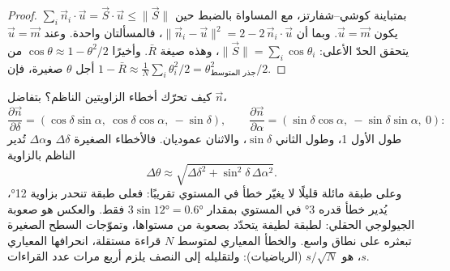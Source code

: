 \begin{proof}
$\sum_i \vec n_i\cdot\vec u = \vec S\cdot\vec u \le \|\vec S\|$ بمتباينة كوشي–شفارتز، مع المساواة بالضبط حين يكون $\vec u = \vec m$.
وبما أن $\|\vec n_i - \vec u\|^2 = 2 - 2\,\vec n_i\cdot\vec u$، فالمسألتان واحدة. وعند $\vec u = \vec m$ يتحقق الحدّ الأعلى: $\|\vec S\| = \sum_i\cos\theta_i$، وهذه صيغة $\bar R$. وأخيرًا $\cos\theta \approx 1 - \theta^2/2$ من أجل $\theta$ صغيرة، فإن $1 - \bar R \approx
\frac1N\sum_i\theta_i^2/2 = \theta_{\text{جذر المتوسط}}^2/2$.
\end{proof}

كيف تحرّك أخطاء الزاويتين الناظم؟ بتفاضل $\vec n$،
\[
  \frac{\partial\vec n}{\partial\delta} = (\cos\delta\sin\alpha,\ \cos\delta\cos\alpha,\ -\sin\delta),
  \qquad
  \frac{\partial\vec n}{\partial\alpha} = (\sin\delta\cos\alpha,\ -\sin\delta\sin\alpha,\ 0):
\]
طول الأول 1، وطول الثاني $\sin\delta$، والاثنان عموديان. فالأخطاء الصغيرة $\Delta\delta$ و$\Delta\alpha$ تُدير الناظم بالزاوية
\[
  \Delta\theta \approx \sqrt{\Delta\delta^2 + \sin^2\delta\,\Delta\alpha^2}.
\]
وعلى طبقة مائلة قليلًا لا يغيّر خطأ في  المستوي تقريبًا: فعلى طبقة تنحدر بزاوية \ang{12}، يُدير خطأ قدره \ang{3} في  المستوي بمقدار $3\sin\ang{12} = \ang{0.6}$ فقط. والعكس هو صعوبة الجيولوجي الحقلي:  لطبقة لطيفة يتحدّد بصعوبة من مستواها، وتموّجات السطح الصغيرة تبعثره على نطاق واسع. والخطأ المعياري لمتوسط $N$ قراءة مستقلة، انحرافها المعياري $s$، هو $s/\sqrt N$ (الرياضيات): ولتقليله إلى النصف يلزم أربع مرات عدد القراءات.

